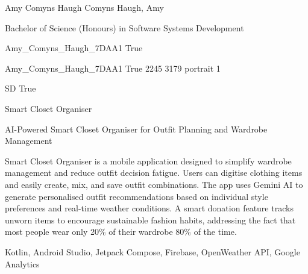 \documentclass[twoside]{report}
\begin{document}
\begingroup{}\relax



\def\Key{Amy_Comyns_Haugh_7DAA1}

{Amy Comyns Haugh}
{Comyns Haugh, Amy}

{Bachelor of Science (Honours) in Software Systems Development}

{Amy_Comyns_Haugh_7DAA1}
{True}

{Amy_Comyns_Haugh_7DAA1}
{True}
{2245}
{3179}
{portrait}
{1}

{SD}
{True}

{Smart Closet Organiser}

{AI-Powered Smart Closet Organiser for Outfit Planning and Wardrobe Management}

{Smart Closet Organiser is a mobile application designed to simplify wardrobe management and reduce outfit decision fatigue. Users can digitise clothing items and easily create, mix, and save outfit combinations. The app uses Gemini AI to generate personalised outfit recommendations based on individual style preferences and real-time weather conditions. A smart donation feature tracks unworn items to encourage sustainable fashion habits, addressing the fact that most people wear only 20\% of their wardrobe 80\% of the time.}

{Kotlin, Android Studio, Jetpack Compose, Firebase, OpenWeather API, Google Analytics}
\end{document}
